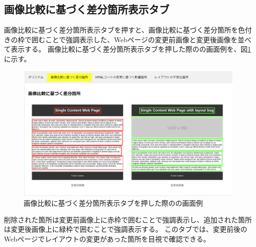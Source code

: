 \subsection{画像比較に基づく差分箇所表示タブ}\label{subsec:images_tab}
画像比較に基づく差分箇所表示タブを押すと、画像比較に基づく差分箇所を色付きの枠で囲むことで強調表示した、Webページの変更前画像と変更後画像を並べて表示する。
画像比較に基づく差分箇所表示タブを押した際の\toolName の画面例を、図\ref{fig: Appearance_images_tab}に示す。
\begin{figure}[tp]
    \begin{center}
        \includegraphics[width=1.0\columnwidth]{image/3_images_tab2.png}
        \caption{画像比較に基づく差分箇所表示タブを押した際の\toolName の画面例}
        \label{fig: Appearance_images_tab}
    \end{center}
\end{figure}
削除された箇所は変更前画像上に赤枠で囲むことで強調表示し、追加された箇所は変更後画像上に緑枠で囲むことで強調表示する。
このタブでは、変更前後のWebページでレイアウトの変更があった箇所を目視で確認できる。

